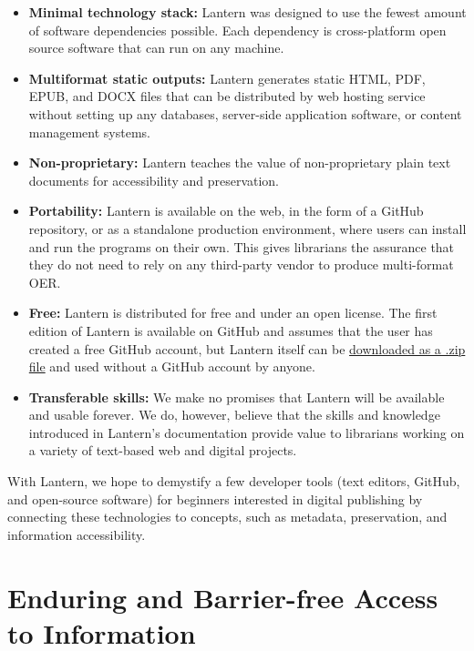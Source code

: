 \documentclass{book}
\begin{document}
\begin{itemize}
\item
  \textbf{Minimal technology stack:} Lantern was designed to use the fewest
  amount of software dependencies possible. Each dependency is cross-platform
  open source software that can run on any machine.
\item
  \textbf{Multiformat static outputs:} Lantern generates static HTML, PDF,
  EPUB, and DOCX files that can be distributed by web hosting service without
  setting up any databases, server-side application software, or content
  management systems.
\item
  \textbf{Non-proprietary:} Lantern teaches the value of non-proprietary plain
  text documents for accessibility and preservation.
\item
  \textbf{Portability:} Lantern is available on the web, in the form of a
  GitHub repository, or as a standalone production environment, where users
  can install and run the programs on their own. This gives librarians the
  assurance that they do not need to rely on any third-party vendor to produce
  multi-format OER.
\item
  \textbf{Free:} Lantern is distributed for free and under an open license.
  The first edition of Lantern is available on GitHub and assumes that the
  user has created a free GitHub account, but Lantern itself can be
  \href{https://github.com/nulib-oer/lantern/archive/refs/heads/main.zip}{downloaded
  as a .zip file} and used without a GitHub account by anyone.
\item
  \textbf{Transferable skills:} We make no promises that Lantern will be
  available and usable forever. We do, however, believe that the skills and
  knowledge introduced in Lantern's documentation provide value to librarians
  working on a variety of text-based web and digital projects.
\end{itemize}

With Lantern, we hope to demystify a few developer tools (text editors,
GitHub, and open-source software) for beginners interested in digital
publishing by connecting these technologies to concepts, such as metadata,
preservation, and information accessibility.

\hypertarget{enduring-and-barrier-free-access-to-information}{%
\section{Enduring and Barrier-free Access to
Information}\label{enduring-and-barrier-free-access-to-information}}
\end{document}
